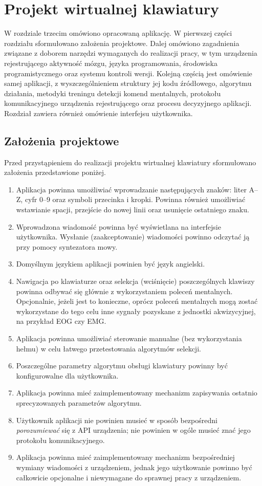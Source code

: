 \documentclass[skorowidz,skroty]{dyplomWEZUT}
\begin{document}
\chapter{Projekt wirtualnej klawiatury}
W rozdziale trzecim omówiono opracowaną aplikację. W pierwszej części rozdziału sformułowano założenia projektowe. Dalej omówiono zagadnienia związane z doborem narzędzi wymaganych do realizacji pracy, w tym urządzenia rejestrującego aktywność mózgu, języka programowania, środowiska programistycznego oraz systemu kontroli wersji. Kolejną częścią jest omówienie samej aplikacji, z wyszczególnieniem struktury jej kodu źródłowego, algorytmu działania, metodyki treningu detekcji komend mentalnych, protokołu komunikacyjnego urządzenia rejestrującego oraz procesu decyzyjnego aplikacji. Rozdział zawiera również omówienie interfejsu użytkownika.  

\section{Założenia projektowe}
Przed przystąpieniem do realizacji projektu wirtualnej klawiatury sformułowano założenia przedstawione poniżej.

\begin{enumerate}
    \item Aplikacja powinna umożliwiać wprowadzanie następujących znaków: liter A--Z, cyfr 0--9 oraz symboli przecinka i kropki. Powinna również umożliwiać wstawianie spacji, przejście do nowej linii oraz usunięcie ostatniego znaku.
    \item Wprowadzona wiadomość powinna być wyświetlana na interfejsie użytkownika. Wysłanie (zaakceptowanie) wiadomości powinno odczytać ją przy pomocy syntezatora mowy.
    \item Domyślnym językiem aplikacji powinien być język angielski.
    \item Nawigacja po klawiaturze oraz selekcja (wciśnięcie) poszczególnych klawiszy powinna odbywać się głównie z wykorzystaniem poleceń mentalnych. Opcjonalnie, jeżeli jest to konieczne, oprócz poleceń mentalnych mogą zostać wykorzystane do tego celu inne sygnały pozyskane z jednostki akwizycyjnej, na przykład EOG czy EMG.
    \item Aplikacja powinna umożliwiać sterowanie manualne (bez wykorzystania hełmu) w celu łatwego przetestowania algorytmów selekcji.
    \item Poszczególne parametry algorytmu obsługi klawiatury powinny być konfigurowalne dla użytkownika.
    \item Aplikacja powinna mieć zaimplementowany mechanizm zapisywania ostatnio sprecyzowanych parametrów algorytmu.
    \item Użytkownik aplikacji nie powinien musieć w sposób bezpośredni \textit{porozumiewać} się z API urządzenia; nie powinien w ogóle musieć znać jego protokołu komunikacyjnego.
    \item Aplikacja powinna mieć zaimplementowany mechanizm bezpośredniej wymiany wiadomości z urządzeniem, jednak jego użytkowanie powinno być całkowicie opcjonalne i niewymagane do sprawnej pracy z urządzeniem.
\end{enumerate}
\end{document}
